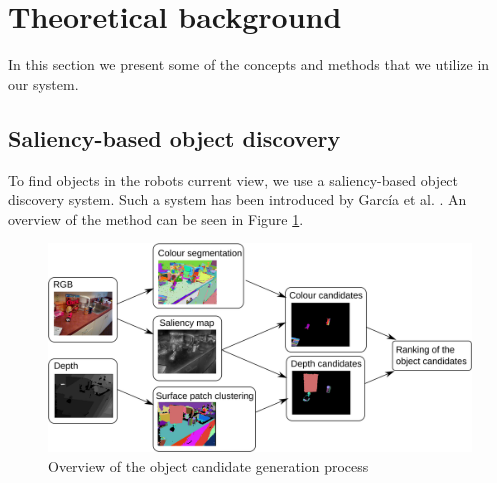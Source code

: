\documentclass[a4paper,11pt,english]{article}
\begin{document}
\section{Theoretical background}

In this section we present some of the concepts and methods that we utilize in our system.

\subsection{Saliency-based object discovery}
To find objects in the robots current view, we use a saliency-based object discovery system.
Such a system has been introduced by García et al. \cite{garcia2015saliency}.
An overview of the method can be seen in Figure \ref{fig:2Dobject_discovery}.

\begin{figure}[h!]
	\begin{center}
		\includegraphics[width=1\textwidth]{src/saliency_object_detection.png}
		\caption{ Overview of the object candidate generation process \cite{garcia2015saliency}}
		\label{fig:2Dobject_discovery}
	\end{center}
\end{figure}
\end{document}
